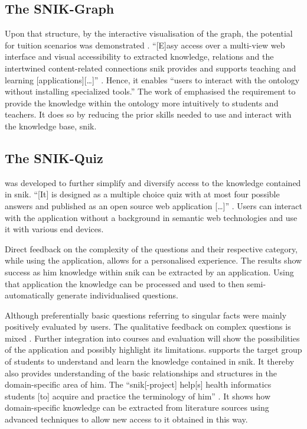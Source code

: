 \subsection{The SNIK-Graph}
%
Upon that structure, by the interactive visualisation of the graph, the potential for tuition scenarios was demonstrated \citep{snikgraphposter}.
\enquote{[E]asy access over a multi-view web interface and visual accessibility to extracted knowledge, relations and the intertwined content-related connections \ac{snik} provides and supports teaching and learning [applications][\dots]} \citep{sniktec}.
Hence, it enables \enquote{users to interact with the ontology without installing specialized tools.}
The work of \citet{snikgraphposter} emphasised the requirement to provide the knowledge within the ontology more intuitively to students and teachers.
It does so by reducing the prior skills needed to use and interact with the knowledge base, \ac{snik}.\\[1em]
%
\subsection{The SNIK-Quiz}
%
\citet{snikquiz} was developed to further simplify and diversify access to the knowledge contained in \ac{snik}.
\enquote{[It] is designed as a multiple choice quiz with at most four possible answers and published as an open source web application [\dots]} \citep{snikquiz}.
Users can interact with the application without a background in semantic web technologies and use it with various end devices.

Direct feedback on the complexity of the questions and their respective category, while using the application, allows for a personalised experience. 
The results show success as \ac{him} knowledge within \ac{snik} can be extracted by an application.
Using that application the knowledge can be processed and used to then semi-automatically generate individualised questions.

Although preferentially basic questions referring to singular facts were mainly positively evaluated by users. 
The qualitative feedback on complex questions is mixed \citep{snikquiz}.
Further integration into courses and evaluation will show the possibilities of the application and possibly highlight its limitations.
%
\citet{snikquiz} supports the target group of students to understand and learn the knowledge contained in \ac{snik}.
It thereby also provides understanding of the basic relationships and structures in the domain-specific area of \ac{him}.
%
The \enquote{\ac{snik}[-project] help[s] health informatics students [to] acquire and practice the terminology of \ac{him}} \citep{sniktec}.
It shows how domain-specific knowledge can be extracted from literature sources using advanced techniques to allow new access to it obtained in this way.
